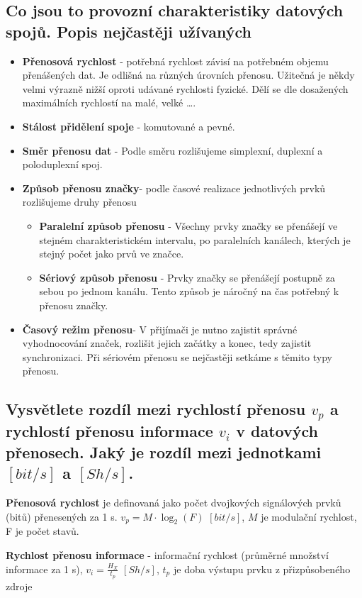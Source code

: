 \subsection{Co jsou to provozní charakteristiky datových spojů. Popis nejčastěji užívaných}
\begin{itemize}
    \item \textbf{Přenosová rychlost} - potřebná rychlost závisí na potřebném objemu přenášených dat.
    Je odlišná na různých úrovních přenosu.
    Užitečná je někdy velmi výrazně nižší oproti udávané rychlosti fyzické.
    Dělí se dle dosažených maximálních rychlostí na malé, velké \dots.
    \item \textbf{Stálost přidělení spoje} - komutované a pevné.
    \item \textbf{Směr přenosu dat} - Podle směru rozlišujeme simplexní, duplexní a poloduplexní spoj.
    \item \textbf{Způsob přenosu značky}- podle časové realizace jednotlivých prvků rozlišujeme druhy přenosu
    \begin{itemize}
        \item \textbf{Paralelní způsob přenosu} - Všechny prvky značky se přenášejí ve stejném charakteristickém intervalu, po paralelních kanálech, kterých je stejný počet jako prvů ve značce.
        \item \textbf{Sériový způsob přenosu} - Prvky značky se přenášejí postupně za sebou po jednom kanálu.
        Tento způsob je náročný na čas potřebný k přenosu značky.
                
    \end{itemize}
    \item \textbf{ Časový režim přenosu}- V přijímači je nutno zajistit správné vyhodnocování značek, rozlišit jejich začátky a konec, tedy zajistit synchronizaci.
    Při sériovém přenosu se nejčastěji setkáme s těmito typy přenosu.
\end{itemize}

\subsection{Vysvětlete rozdíl mezi rychlostí přenosu $v_p$ a rychlostí přenosu informace $v_i$ v datových přenosech.
Jaký je rozdíl mezi jednotkami $[bit/s]$ a $[Sh/s]$.}
\textbf{Přenosová rychlost} je definovaná jako počet dvojkových signálových prvků (bitů) přenesených za 1 s. 
$v_p=M\cdot \log_2(F)$ $[bit/s]$, $M$ je modulační rychlost, F je počet stavů.

\textbf{Rychlost přenosu informace} - informační rychlost (průměrné množství informace za 1 s), $v_i=\frac{H_X}{t_p}$ 
$[Sh/s]$, $t_p$ je doba výstupu prvku z přizpůsobeného zdroje

